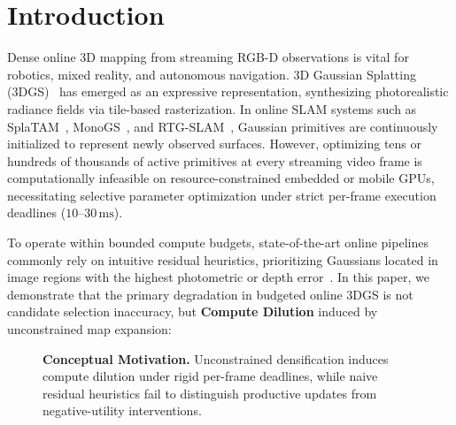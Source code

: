 \documentclass[10pt,twocolumn,letterpaper]{article}
\begin{document}
\section{Introduction}
Dense online 3D mapping from streaming RGB-D observations is vital for robotics, mixed reality, and autonomous navigation. 3D Gaussian Splatting (3DGS)~\cite{kerbl3Dgaussians} has emerged as an expressive representation, synthesizing photorealistic radiance fields via tile-based rasterization. In online SLAM systems such as SplaTAM~\cite{keetha2023splatam}, MonoGS~\cite{matsuki2024gaussian}, and RTG-SLAM~\cite{peng2024rtgslam}, Gaussian primitives are continuously initialized to represent newly observed surfaces. However, optimizing tens or hundreds of thousands of active primitives at every streaming video frame is computationally infeasible on resource-constrained embedded or mobile GPUs, necessitating selective parameter optimization under strict per-frame execution deadlines ($10\text{--}30\,\mathrm{ms}$).

To operate within bounded compute budgets, state-of-the-art online pipelines commonly rely on intuitive residual heuristics, prioritizing Gaussians located in image regions with the highest photometric or depth error~\cite{peng2024rtgslam}. In this paper, we demonstrate that the primary degradation in budgeted online 3DGS is not candidate selection inaccuracy, but \textbf{Compute Dilution} induced by unconstrained map expansion:

\begin{figure}[t]
\centering
{}
\caption{\textbf{Conceptual Motivation.} Unconstrained densification induces compute dilution under rigid per-frame deadlines, while naive residual heuristics fail to distinguish productive updates from negative-utility interventions.}
\label{fig:motivation}
\end{figure}
\end{document}
